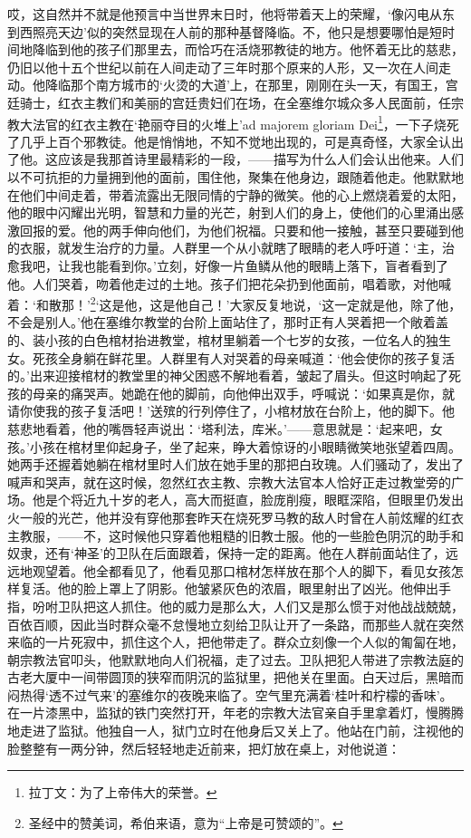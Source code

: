 \par 哎，这自然并不就是他预言中当世界末日时，他将带着天上的荣耀，‘像闪电从东到西照亮天边’似的突然显现在人前的那种基督降临。不，他只是想要哪怕是短时间地降临到他的孩子们那里去，而恰巧在活烧邪教徒的地方。他怀着无比的慈悲，仍旧以他十五个世纪以前在人间走动了三年时那个原来的人形，又一次在人间走动。他降临那个南方城市的‘火烫的大道’上，在那里，刚刚在头一天，有国王，宫廷骑士，红衣主教们和美丽的宫廷贵妇们在场，在全塞维尔城众多人民面前，任宗教大法官的红衣主教在‘艳丽夺目的火堆上’ad majorem gloriam Dei\footnote{拉丁文：为了上帝伟大的荣誉。}，一下子烧死了几乎上百个邪教徒。他是悄悄地，不知不觉地出现的，可是真奇怪，大家全认出了他。这应该是我那首诗里最精彩的一段，——描写为什么人们会认出他来。人们以不可抗拒的力量拥到他的面前，围住他，聚集在他身边，跟随着他走。他默默地在他们中间走着，带着流露出无限同情的宁静的微笑。他的心上燃烧着爱的太阳，他的眼中闪耀出光明，智慧和力量的光芒，射到人们的身上，使他们的心里涌出感激回报的爱。他的两手伸向他们，为他们祝福。只要和他一接触，甚至只要碰到他的衣服，就发生治疗的力量。人群里一个从小就瞎了眼睛的老人呼吁道：‘主，治愈我吧，让我也能看到你。’立刻，好像一片鱼鳞从他的眼睛上落下，盲者看到了他。人们哭着，吻着他走过的土地。孩子们把花朵扔到他面前，唱着歌，对他喊着：‘和散那！’\footnote{圣经中的赞美词，希伯来语，意为“上帝是可赞颂的”。}‘这是他，这是他自己！’大家反复地说，‘这一定就是他，除了他，不会是别人。’他在塞维尔教堂的台阶上面站住了，那时正有人哭着把一个敞着盖的、装小孩的白色棺材抬进教堂，棺材里躺着一个七岁的女孩，一位名人的独生女。死孩全身躺在鲜花里。人群里有人对哭着的母亲喊道：‘他会使你的孩子复活的。’出来迎接棺材的教堂里的神父困惑不解地看着，皱起了眉头。但这时响起了死孩的母亲的痛哭声。她跪在他的脚前，向他伸出双手，呼喊说：‘如果真是你，就请你使我的孩子复活吧！’送殡的行列停住了，小棺材放在台阶上，他的脚下。他慈悲地看着，他的嘴唇轻声说出：‘塔利法，库米。’——意思就是：‘起来吧，女孩。’小孩在棺材里仰起身子，坐了起来，睁大着惊讶的小眼睛微笑地张望着四周。她两手还握着她躺在棺材里时人们放在她手里的那把白玫瑰。人们骚动了，发出了喊声和哭声，就在这时候，忽然红衣主教、宗教大法官本人恰好正走过教堂旁的广场。他是个将近九十岁的老人，高大而挺直，脸庞削瘦，眼眶深陷，但眼里仍发出火一般的光芒，他并没有穿他那套昨天在烧死罗马教的敌人时曾在人前炫耀的红衣主教服，——不，这时候他只穿着他粗糙的旧教士服。他的一些脸色阴沉的助手和奴隶，还有‘神圣’的卫队在后面跟着，保持一定的距离。他在人群前面站住了，远远地观望着。他全都看见了，他看见那口棺材怎样放在那个人的脚下，看见女孩怎样复活。他的脸上罩上了阴影。他皱紧灰色的浓眉，眼里射出了凶光。他伸出手指，吩咐卫队把这人抓住。他的威力是那么大，人们又是那么惯于对他战战兢兢，百依百顺，因此当时群众毫不怠慢地立刻给卫队让开了一条路，而那些人就在突然来临的一片死寂中，抓住这个人，把他带走了。群众立刻像一个人似的匍匐在地，朝宗教法官叩头，他默默地向人们祝福，走了过去。卫队把犯人带进了宗教法庭的古老大厦中一间带圆顶的狭窄而阴沉的监狱里，把他关在里面。白天过后，黑暗而闷热得‘透不过气来’的塞维尔的夜晚来临了。空气里充满着‘桂叶和柠檬的香味’。在一片漆黑中，监狱的铁门突然打开，年老的宗教大法官亲自手里拿着灯，慢腾腾地走进了监狱。他独自一人，狱门立时在他身后又关上了。他站在门前，注视他的脸整整有一两分钟，然后轻轻地走近前来，把灯放在桌上，对他说道：
